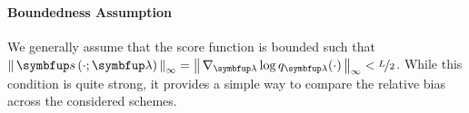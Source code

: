 \vspace{-0.05in}
\paragraph{Boundedness Assumption}
We generally assume that the score function is bounded such that \(\norm{ \vs\left(\cdot; \vlambda\right) }_{\infty}= \norm{\nabla_{\vlambda} \log q_{\vlambda}(\cdot)}_{\infty}  < \nicefrac{L}{2}\).
While this condition is quite strong, it provides a simple way to compare the relative bias across the considered schemes.


%

